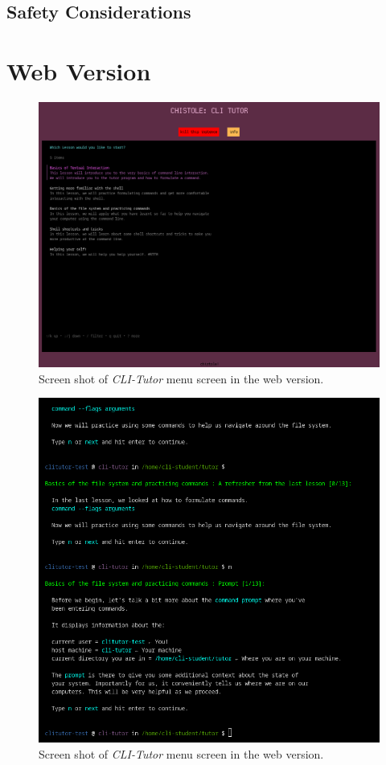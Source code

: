 \subsection{Safety Considerations}
\section{Web Version}


\begin{figure}[htbp]
	\centering
	\includegraphics[width=1\textwidth]{img/cliwebfull}
	\caption{Screen shot of \textit{CLI-Tutor} menu screen in the web version.}
	\label{fig:webversion}
\end{figure}

\begin{figure}[htbp]
	\centering
	\includegraphics[width=1\textwidth]{img/cliexpansionfull}
	\caption{Screen shot of \textit{CLI-Tutor} menu screen in the web version.}
	\label{fig:webversion}
\end{figure}


